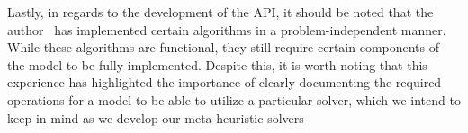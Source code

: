 Lastly, in regards to the development of the API, it should be noted that the
author~\cite{outeiro2021application} has implemented certain algorithms in a
problem-independent manner. While these algorithms are functional, they still
require certain components of the model to be fully implemented. Despite this,
it is worth noting that this experience has highlighted the importance of
clearly documenting the required operations for a model to be able to utilize a
particular solver, which we intend to keep in mind as we develop our
meta-heuristic solvers